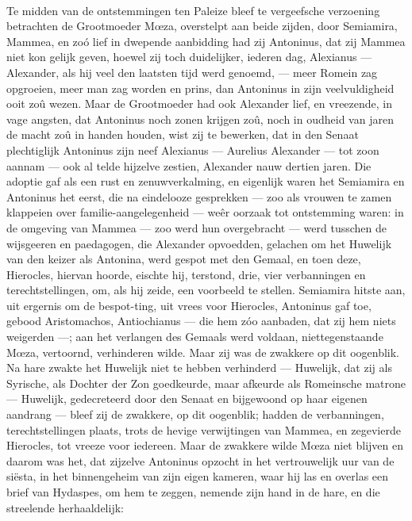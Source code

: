 \documentclass[a4paper, 12pt, oneside, dutch]{article}
\begin{document}
\paragraph{}
Te midden van de ontstemmingen ten Paleize bleef te vergeefsche verzoening betrachten de Grootmoeder Mœza, overstelpt aan beide zijden, door Semiamira, Mammea, en zoó lief in dwepende aanbidding had zij Antoninus, dat zij Mammea niet kon gelijk geven, hoewel zij toch duidelijker, iederen dag, Alexianus --- Alexander, als hij veel den laatsten tijd werd genoemd, --- meer Romein zag opgroeien, meer man zag worden en prins, dan Antoninus in zijn veelvuldigheid ooit zoû wezen. Maar de Grootmoeder had ook Alexander lief, en vreezende, in vage angsten, dat Antoninus noch zonen krijgen zoû, noch in oudheid van jaren de macht zoû in handen houden, wist zij te bewerken, dat in den Senaat plechtiglijk Antoninus zijn neef Alexianus --- Aurelius Alexander --- tot zoon aannam --- ook al telde hijzelve zestien, Alexander nauw dertien jaren. Die adoptie gaf als een rust en zenuwverkalming, en eigenlijk waren het Semiamira en Antoninus het eerst, die na eindelooze gesprekken --- zoo als vrouwen te zamen klappeien over familie-aangelegenheid --- weêr oorzaak tot ontstemming waren: in de omgeving van Mammea --- zoo werd hun overgebracht --- werd tusschen de wijsgeeren en paedagogen, die Alexander opvoedden, gelachen om het Huwelijk van den keizer als Antonina, werd gespot met den Gemaal, en toen deze, Hierocles, hiervan hoorde, eischte hij, terstond, drie, vier verbanningen en terechtstellingen, om, als hij zeide, een voorbeeld te stellen. Semiamira hitste aan, uit ergernis om de bespot-ting, uit vrees voor Hierocles, Antoninus gaf toe, gebood Aristomachos, Antiochianus --- die hem zóo aanbaden, dat zij hem niets weigerden ---; aan het verlangen des Gemaals werd voldaan, niettegenstaande Mœza, vertoornd, verhinderen wilde. Maar zij was de zwakkere op dit oogenblik. Na hare zwakte het Huwelijk niet te hebben verhinderd --- Huwelijk, dat zij als Syrische, als Dochter der Zon goedkeurde, maar afkeurde als Romeinsche matrone --- Huwelijk, gedecreteerd door den Senaat en bijgewoond op haar eigenen aandrang --- bleef zij de zwakkere, op dit oogenblik; hadden de verbanningen, terechtstellingen plaats, trots de hevige verwijtingen van Mammea, en zegevierde Hierocles, tot vreeze voor iedereen. Maar de zwakkere wilde Mœza niet blijven en daarom was het, dat zijzelve Antoninus opzocht in het vertrouwelijk uur van de siësta, in het binnengeheim van zijn eigen kameren, waar hij las en overlas een brief van Hydaspes, om hem te zeggen, nemende zijn hand in de hare, en die streelende herhaaldelijk:
\end{document}
